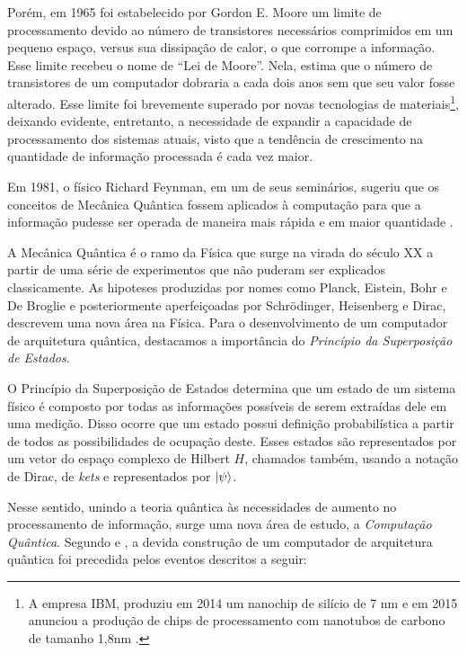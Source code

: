 \documentclass[12pt,oneside,brazil,hidelinks,article,sumario=tradicional,a4paper]{abntex2}
\begin{document}
Porém, em 1965 foi estabelecido por Gordon E. Moore um limite de processamento devido ao número de transistores necessários comprimidos em um pequeno espaço, versus sua dissipação de calor, o que corrompe a informação. Esse limite recebeu o nome de ``Lei de Moore''. Nela, \textcite{moore} estima que o número de transistores de um computador dobraria a cada dois anos sem que seu valor fosse alterado. Esse limite foi brevemente superado por novas tecnologias de materiais\footnote{A empresa IBM, produziu em 2014 um nanochip de silício de 7 nm e em 2015 anunciou a produção de chips de processamento com nanotubos de carbono de tamanho 1,8nm \cite{chipibm}.}, deixando evidente, entretanto, a necessidade de expandir a capacidade de processamento dos sistemas atuais, visto que a tendência de crescimento na quantidade de informação processada é cada vez maior.

Em 1981, o físico Richard Feynman, em um de seus seminários, sugeriu que os conceitos de Mecânica Quântica fossem aplicados à computação para que a informação pudesse ser operada de maneira mais rápida e em maior quantidade \cite{TeoQuanInfoEntreCopia}.

A Mecânica Quântica é o ramo da Física que surge na virada do século XX a partir de uma série de experimentos que não puderam ser explicados classicamente. As hipoteses produzidas por nomes como Planck, Eistein, Bohr e De Broglie e posteriormente aperfeiçoadas por Schrödinger, Heisenberg e Dirac, descrevem uma nova área na Física. Para o desenvolvimento de um computador de arquitetura quântica, destacamos a importância do \textit{Princípio da Superposição de Estados}.

O Princípio da Superposição de Estados determina que um estado de um sistema físico é composto por todas as informações possíveis de serem extraídas dele em uma medição. Disso ocorre que um estado possui definição probabilística a partir de todos as possibilidades de ocupação deste. Esses estados são representados por um vetor do espaço complexo de Hilbert $H$, chamados também, usando a notação de Dirac, de \textit{kets} e representados por $\ket{\psi}$.

Nesse sentido, unindo a teoria quântica às necessidades de aumento no processamento de informação, surge uma nova área de estudo, a \textit{Computação Quântica}. Segundo \textcite{CompInfoQuantica} e \textcite{dwave}, a devida construção de um computador de arquitetura quântica foi precedida pelos eventos descritos a seguir:
\end{document}
